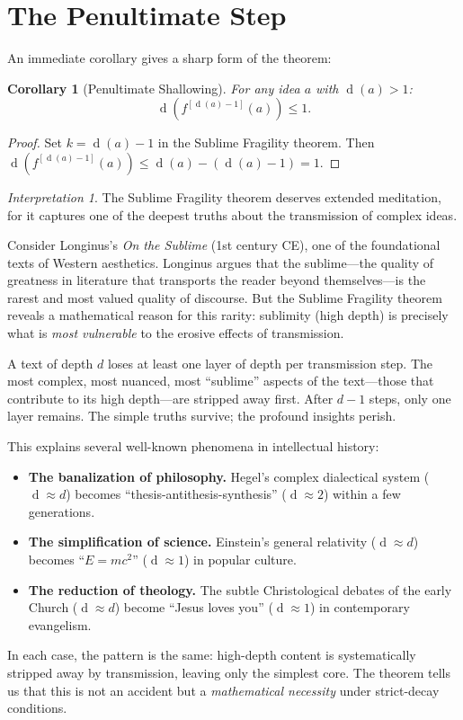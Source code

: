 \documentclass[11pt,openany]{book}
\theoremstyle{definition}
\theoremstyle{plain}
\newtheorem{corollary}[axiom]{Corollary}
\theoremstyle{remark}
\newtheorem{interpretation}[axiom]{Interpretation}
\newcommand{\depth}{\operatorname{d}}       %
\begin{document}
\section{The Penultimate Step}

An immediate corollary gives a sharp form of the theorem:

\begin{corollary}[Penultimate Shallowing]
\label{cor:penultimate}
For any idea $a$ with $\depth(a) > 1$:
\[
\depth(f^{[\depth(a) - 1]}(a)) \leq 1.
\]
\end{corollary}

\begin{proof}
Set $k = \depth(a) - 1$ in the Sublime Fragility theorem. Then $\depth(f^{[\depth(a)-1]}(a)) \leq \depth(a) - (\depth(a) - 1) = 1$.
\end{proof}

\begin{interpretation}
The Sublime Fragility theorem deserves extended meditation, for it captures one of the deepest truths about the transmission of complex ideas.

Consider Longinus's \textit{On the Sublime} (1st century CE), one of the foundational texts of Western aesthetics. Longinus argues that the sublime---the quality of greatness in literature that transports the reader beyond themselves---is the rarest and most valued quality of discourse. But the Sublime Fragility theorem reveals a mathematical reason for this rarity: sublimity (high depth) is precisely what is \emph{most vulnerable} to the erosive effects of transmission.

A text of depth $d$ loses at least one layer of depth per transmission step. The most complex, most nuanced, most ``sublime'' aspects of the text---those that contribute to its high depth---are stripped away first. After $d - 1$ steps, only one layer remains. The simple truths survive; the profound insights perish.

This explains several well-known phenomena in intellectual history:
\begin{itemize}
\item \textbf{The banalization of philosophy.} Hegel's complex dialectical system ($\depth \approx d$) becomes ``thesis-antithesis-synthesis'' ($\depth \approx 2$) within a few generations.
\item \textbf{The simplification of science.} Einstein's general relativity ($\depth \approx d$) becomes ``$E = mc^2$'' ($\depth \approx 1$) in popular culture.
\item \textbf{The reduction of theology.} The subtle Christological debates of the early Church ($\depth \approx d$) become ``Jesus loves you'' ($\depth \approx 1$) in contemporary evangelism.
\end{itemize}

In each case, the pattern is the same: high-depth content is systematically stripped away by transmission, leaving only the simplest core. The theorem tells us that this is not an accident but a \emph{mathematical necessity} under strict-decay conditions.
\end{interpretation}
\end{document}
